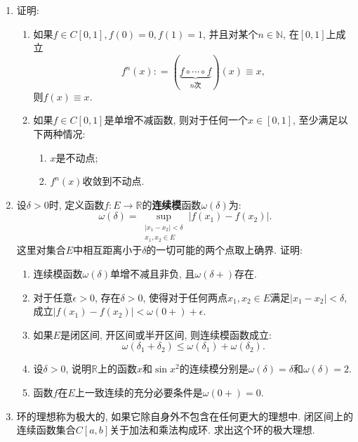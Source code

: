\documentclass[UTF8,11pt, a4paper, oneside, fontset=none]{ctexbook}
\begin{document}
\begin{enumerate}
\item 证明:
\begin{enumerate}
\item 如果$f \in C[0, 1], f(0) = 0, f(1) = 1$, 并且对某个$n \in \mathbb N$, 在$[0, 1]$上成立
\[
f^n(x) : = (\underbrace{f \circ \cdots \circ f}_{n\text{次}}) (x) \equiv x,
\] 
则$f(x) \equiv x$.

\item 如果$f \in C[0, 1]$是单增不减函数, 则对于任何一个$x \in [0, 1]$, 至少满足以下两种情况:
\begin{enumerate}
\item[(i)] $x$是不动点;

\item[(ii)] $f^n(x)$收敛到不动点.
\end{enumerate}

\end{enumerate}

\item 设$\delta >0$时, 定义函数$f : E \to \mathbb R$的{\bf 连续模}函数$\omega(\delta)$为:
\[
\omega(\delta) = \sup_{\substack{|x_1 - x_2| <\delta \\ x_1, x_2 \in E}} |f(x_1) - f(x_2)|.
\]
这里对集合$E$中相互距离小于$\delta$的一切可能的两个点取上确界. 证明:

\begin{enumerate}
\item 连续模函数$\omega(\delta)$单增不减且非负, 且$\omega(\delta +)$存在.

\item 对于任意$\epsilon >0$, 存在$\delta >0$, 使得对于任何两点$x_1, x_2 \in E$满足$|x_1 - x_2| < \delta$, 成立$|f(x_1) - f(x_2)| < \omega(0+) + \epsilon$.

\item 如果$E$是闭区间, 开区间或半开区间, 则连续模函数成立:
\[
\omega(\delta_1 + \delta_2) \leq \omega(\delta_1) + \omega(\delta_2).
\]

\item 设$\delta>0$, 说明$\mathbb R$上的函数$x$和$\sin x^2$的连续模分别是$\omega(\delta) = \delta$和$\omega(\delta) = 2$.

\item 函数$f$在$E$上一致连续的充分必要条件是$\omega(0+) =0$.
\end{enumerate}

\item 环的理想称为极大的, 如果它除自身外不包含在任何更大的理想中. 闭区间上的连续函数集合$C[a, b]$关于加法和乘法构成环. 求出这个环的极大理想. 
\end{enumerate}
\end{document}
